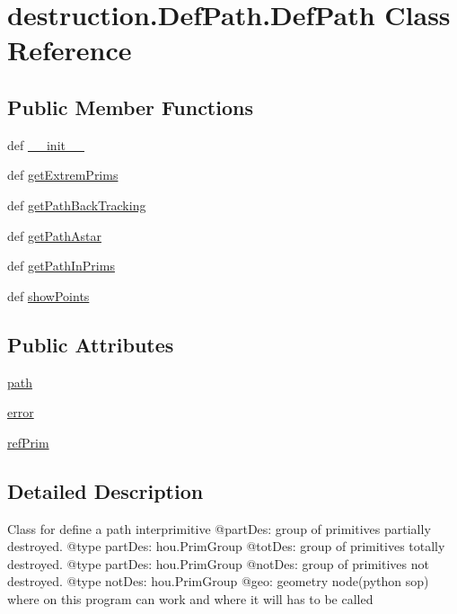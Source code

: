 \hypertarget{classdestruction_1_1_def_path_1_1_def_path}{\section{destruction.\-Def\-Path.\-Def\-Path Class Reference}
\label{classdestruction_1_1_def_path_1_1_def_path}
}
\subsection*{Public Member Functions}
\begin{DoxyCompactItemize}
\item 
def \hyperlink{classdestruction_1_1_def_path_1_1_def_path_a491be4746221ca081fcd107b4a6a206c}{\-\_\-\-\_\-init\-\_\-\-\_\-}
\item 
def \hyperlink{classdestruction_1_1_def_path_1_1_def_path_adf9b02d1671d3ff488250b01720cc5f7}{get\-Extrem\-Prims}
\item 
def \hyperlink{classdestruction_1_1_def_path_1_1_def_path_a911b218e1202ee32ac216bbc48eedd02}{get\-Path\-Back\-Tracking}
\item 
def \hyperlink{classdestruction_1_1_def_path_1_1_def_path_a4e2107ee91d4d5615059e51fdb8af67f}{get\-Path\-Astar}
\item 
def \hyperlink{classdestruction_1_1_def_path_1_1_def_path_a2ac904ba71ec3630ee18604fb8af2e5b}{get\-Path\-In\-Prims}
\item 
def \hyperlink{classdestruction_1_1_def_path_1_1_def_path_a172f1fe2fe1ac8cd82a751150a9e12d5}{show\-Points}
\end{DoxyCompactItemize}
\subsection*{Public Attributes}
\begin{DoxyCompactItemize}
\item 
\hyperlink{classdestruction_1_1_def_path_1_1_def_path_a97cac00ba114927444ae72be21272817}{path}
\item 
\hyperlink{classdestruction_1_1_def_path_1_1_def_path_a373d47f935ba8d9e35430b9031a7f283}{error}
\item 
\hyperlink{classdestruction_1_1_def_path_1_1_def_path_aa289b1ff27bc715710713f5981122d70}{ref\-Prim}
\end{DoxyCompactItemize}


\subsection{Detailed Description}
\begin{DoxyVerb}Class for define a path interprimitive
@partDes: group of primitives partially destroyed.
@type partDes: hou.PrimGroup
@totDes: group of primitives totally destroyed.
@type partDes: hou.PrimGroup
@notDes: group of primitives not destroyed.
@type notDes: hou.PrimGroup
@geo: geometry node(python sop) where on this program can work and where it will has to be called
\end{DoxyVerb}
 

